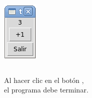 \documentclass[12pt]{beamer}
\begin{document}
\begin{frame}
\begin{columns}
        \includegraphics[width=\textwidth]{programas/tkinter/capturas/06-3.png}
    \end{columns}

   \vfill
    Al hacer clic en el botón , \\
    el programa debe terminar.
  \end{frame}
\end{document}
